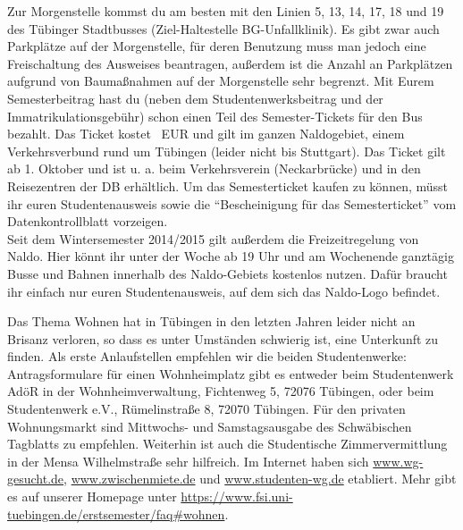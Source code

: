 
Zur Morgenstelle kommst du am besten mit den Linien 5, 13, 14, 17, 18 und 19 des Tübinger
Stadtbusses (Ziel-Haltestelle BG-Unfallklinik). Es gibt zwar auch Parkplätze auf der Morgenstelle,
für deren Benutzung muss man jedoch eine Freischaltung des Ausweises beantragen, außerdem ist die Anzahl an Parkplätzen
aufgrund von Baumaßnahmen auf der Morgenstelle sehr begrenzt.
Mit Eurem Semesterbeitrag hast du (neben dem Studentenwerksbeitrag
und der Immatrikulationsgebühr) schon einen Teil des Semester-Tickets für den Bus bezahlt.
Das Ticket kostet \ticketpreis~EUR und gilt im ganzen Naldogebiet, einem Verkehrsverbund rund um
Tübingen (leider nicht bis Stuttgart). Das Ticket gilt ab 1. Oktober und ist u. a. beim Verkehrsverein
(Neckarbrücke) und in den Reisezentren der DB erhältlich. Um das Semesterticket kaufen zu können, müsst ihr euren Studentenausweis sowie die "`Bescheinigung für das Semesterticket"' vom Datenkontrollblatt vorzeigen. \\
Seit dem Wintersemester 2014/2015 gilt außerdem die Freizeitregelung von Naldo. Hier könnt ihr unter der Woche ab 19 Uhr und am Wochenende ganztägig Busse und Bahnen innerhalb des Naldo-Gebiets kostenlos nutzen. Dafür braucht ihr einfach nur euren Studentenausweis, auf dem sich das Naldo-Logo befindet. %

Das Thema Wohnen hat in Tübingen in den letzten Jahren leider nicht an Brisanz verloren, so dass
es unter Umständen schwierig ist, eine Unterkunft zu finden. Als erste Anlaufstellen empfehlen wir
die beiden Studentenwerke: Antragsformulare für einen Wohnheimplatz gibt es entweder beim
Studentenwerk AdöR in der Wohnheimverwaltung, Fichtenweg 5, 72076 Tübingen, oder beim Studentenwerk
e.V., Rümelinstraße 8, 72070 Tübingen. Für den privaten Wohnungsmarkt sind Mittwochs- und Samstagsausgabe
des Schwäbischen Tagblatts zu empfehlen. Weiterhin ist auch die Studentische Zimmervermittlung in der Mensa
Wilhelmstraße sehr hilfreich. Im Internet haben sich \url{www.wg-gesucht.de}, \url{www.zwischenmiete.de} und
\url{www.studenten-wg.de} etabliert. Mehr gibt es auf
unserer Homepage unter \url{https://www.fsi.uni-tuebingen.de/erstsemester/faq\#wohnen}.
